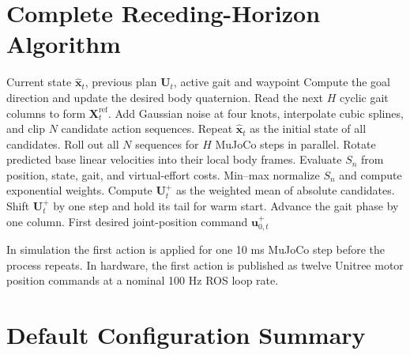 \documentclass[11pt,a4paper]{article}
\newcommand{\code}[1]{\texttt{#1}}
\begin{document}
\section{Complete Receding-Horizon Algorithm}

\begin{algorithm}[ht]
\caption{\code{legged\_mppi} locomotion update}
\label{alg:legged_mppi}
\begin{algorithmic}[1]
  \REQUIRE Current state $\hat{\bm{x}}_t$, previous plan $\bm{U}_t$,
           active gait and waypoint
  \STATE Compute the goal direction and update the desired body quaternion.
  \STATE Read the next $H$ cyclic gait columns to form
         $\bm{X}^{\mathrm{ref}}_t$.
  \STATE Add Gaussian noise at four knots, interpolate cubic splines, and
         clip $N$ candidate action sequences.
  \STATE Repeat $\hat{\bm{x}}_t$ as the initial state of all candidates.
  \STATE Roll out all $N$ sequences for $H$ MuJoCo steps in parallel.
  \STATE Rotate predicted base linear velocities into their local body frames.
  \STATE Evaluate $S_n$ from position, state, gait, and virtual-effort costs.
  \STATE Min--max normalize $S_n$ and compute exponential weights.
  \STATE Compute $\bm{U}_t^+$ as the weighted mean of absolute candidates.
  \STATE Shift $\bm{U}_t^+$ by one step and hold its tail for warm start.
  \STATE Advance the gait phase by one column.
  \RETURN First desired joint-position command $\bm{u}_{0,t}^+$
\end{algorithmic}
\end{algorithm}

In simulation the first action is applied for one 10 ms MuJoCo step before the
process repeats.  In hardware, the first action is published as twelve
Unitree motor position commands at a nominal 100 Hz ROS loop rate.

\section{Default Configuration Summary}
\end{document}
